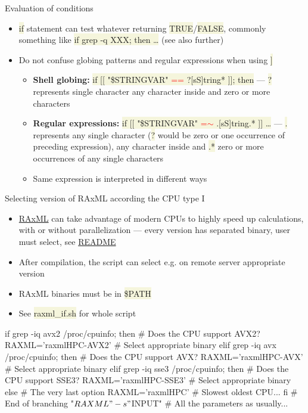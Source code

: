 \documentclass[compress, xelatex, 11pt, xcolor=svgnames, aspectratio=169, url={hyphens, lowtilde}]{beamer}
\renewcommand{\texttt}[1]{\colorbox{Beige}{{\ttfamily #1}}}
\renewcommand{\alert}[1]{\textcolor{red}{#1}}
\begin{document}
\begin{frame}[allowframebreaks]{Evaluation of conditions}
\begin{itemize}
		\item \texttt{if} statement can test whatever returning \texttt{TRUE}/\texttt{FALSE}, commonly something like \texttt{if grep -q XXX; then \ldots} (see also further)
		\item Do not confuse globing patterns and regular expressions when using \texttt{[[~\ldots~]]}
		\begin{itemize}
			\item \textbf{Shell globing:} \texttt{if [[ "\$\textbraceleft STRINGVAR\textbraceright " \alert{==} ?[sS]tring* ]]; then} --- \texttt{?} represents single character \texttt{[]} any character inside and \texttt{*} zero or more characters
			\item \textbf{Regular expressions:} \texttt{if [[ "\$\textbraceleft STRINGVAR\textbraceright " \alert{=$\sim$} .[sS]tring.* ]] \ldots} --- \texttt{.} represents any single character (\texttt{?} would be zero or one occurrence of preceding expression), \texttt{[]} any character inside and \texttt{.*} zero or more occurrences of any single characters
			\item Same expression is interpreted in different ways
		\end{itemize}
	\end{itemize}
\end{frame}

\begin{frame}[fragile]{Selecting version of RAxML according the CPU type I}
	\begin{itemize}
		\item \href{https://github.com/stamatak/standard-RAxML}{RAxML} can take advantage of modern CPUs to highly speed up calculations, with or without parallelization --- every version has separated binary, user must select, see \href{https://github.com/stamatak/standard-RAxML/blob/master/README.md}{README}
		\item After compilation, the script can select e.g. on remote server appropriate version
		\item RAxML binaries must be in \texttt{\$PATH}
		\item See \texttt{raxml\_if.sh} for whole script
	\end{itemize}
	\vfill
	\begin{bashcode}
    if grep -iq avx2 /proc/cpuinfo; then # Does the CPU support AVX2?
      RAXML='raxmlHPC-AVX2' # Select appropriate binary
      elif grep -iq avx /proc/cpuinfo; then # Does the CPU support AVX?
        RAXML='raxmlHPC-AVX' # Select appropriate binary
        elif grep -iq sse3 /proc/cpuinfo; then # Does the CPU support SSE3?
          RAXML='raxmlHPC-SSE3' # Select appropriate binary
          else # The very last option
            RAXML='raxmlHPC' # Slowest oldest CPU...
      fi # End of branching
    "${RAXML}" -s "${INPUT}" # All the parameters as usually...
	\end{bashcode}
\end{frame}
\end{document}
